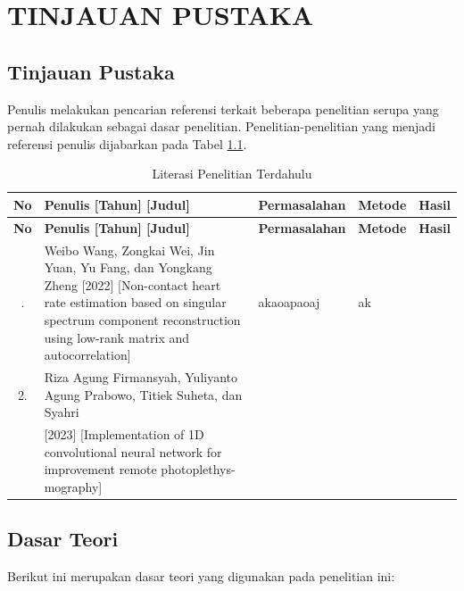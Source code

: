 \newpage
\chapter{TINJAUAN PUSTAKA} \label{Bab II}

\section{Tinjauan Pustaka} \label{II.Tinjauan}
Penulis  melakukan  pencarian  referensi  terkait beberapa penelitian serupa yang pernah dilakukan sebagai dasar penelitian. Penelitian-penelitian yang menjadi referensi penulis dijabarkan pada Tabel \ref{table:2.literasi}. \par
\renewcommand{\arraystretch}{1.0} %
\begin{longtable}{|c|p{}|p{}|p{}|p{}|}
  \caption{Literasi Penelitian Terdahulu}\label{table:2.literasi}\\
  \hline
  \textbf{No} 
    & \textbf{Penulis [Tahun] [Judul]} 
    & \textbf{Permasalahan} 
    & \textbf{Metode} 
    & \textbf{Hasil} \\ %
  \hline
\endfirsthead
  \hline
  \textbf{No} 
    & \textbf{Penulis [Tahun] [Judul]} 
    & \textbf{Permasalahan} 
    & \textbf{Metode} 
    & \textbf{Hasil} \\ %
  \hline
\endhead
  \hline
\endfoot
  \hline
\endlastfoot
    1. & Weibo Wang, Zongkai Wei, Jin Yuan, Yu Fang, dan Yongkang Zheng [2022] [Non-contact heart rate estimation based on singular spectrum component reconstruction using low-rank matrix and autocorrelation] & akaoapaoaj & ak & \\ 
    \hline
    2. & Riza Agung Firmansyah, Yuliyanto Agung Prabowo, Titiek Suheta, dan Syahri &  &  & \\
    \hline
    & [2023] [Implementation of 1D convolutional neural network for improvement remote photoplethys-mography] & & & \\ 
\end{longtable}




\section{Dasar Teori} \label{II.Teori}
Berikut ini merupakan dasar teori yang digunakan pada penelitian ini: \par

